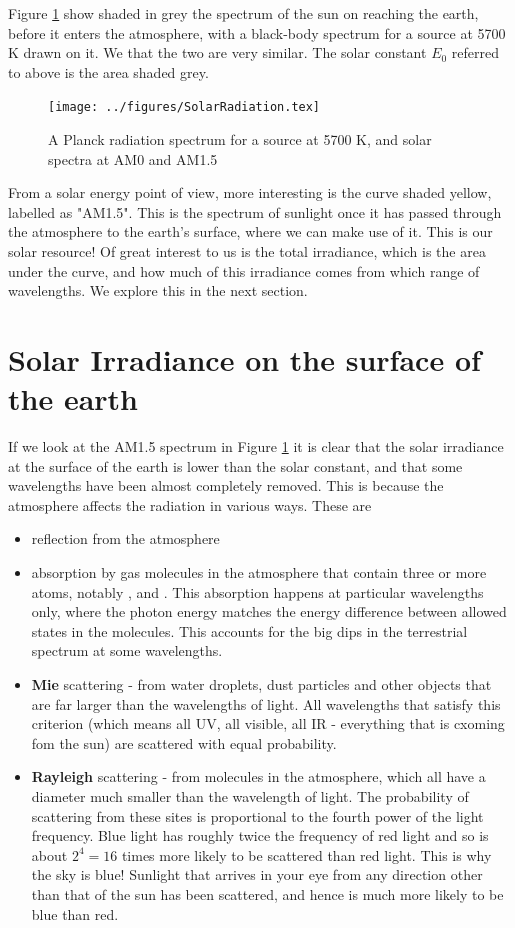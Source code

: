 \documentclass[class=scrartcl, crop=false,parskip=half,]{standalone}
\begin{document}
Figure \ref{fig:SolarSpectra} show shaded in grey the spectrum of the sun on reaching the earth, before it enters the atmosphere, with a black-body spectrum for a source at 5700 K drawn on it. We that the two are very similar. The solar constant $E_0$ referred to above is the area shaded grey.

\begin{figure}
\centering
\texttt{[image: ../figures/SolarRadiation.tex]}
\caption{A Planck radiation spectrum for a source at 5700 K, and solar spectra at AM0 and AM1.5}
\label{fig:SolarSpectra}
\end{figure}

From a solar energy point of view, more interesting is the curve shaded yellow, labelled as "AM1.5". This is the spectrum of sunlight once it has passed through the atmosphere to the earth's surface, where we can make use of it. This is our solar resource! Of great interest to us is the total irradiance, which is the area under the curve, and  how much of this irradiance comes from which range of wavelengths. We explore this in the next section.

\section{Solar Irradiance on the surface of the earth}
If we look at the AM1.5 spectrum in Figure \ref{fig:SolarSpectra} it is clear that the solar irradiance at the surface of the earth is lower than the solar constant, and that some wavelengths have been almost completely removed. This is because the atmosphere affects the radiation in various ways. These are
\begin{itemize}
\item reflection from the atmosphere
\item absorption by gas molecules in the atmosphere that contain three or more atoms, notably ,  and . This absorption happens at particular wavelengths only, where the photon energy matches the energy difference between allowed states in the molecules. This accounts for the big dips in the terrestrial spectrum at some wavelengths.
\item \textbf{Mie} scattering - from water droplets, dust particles and other objects that are far larger than the wavelengths of light. All wavelengths that satisfy this criterion (which means all UV, all visible, all IR - everything that is cxoming fom the sun) are scattered with equal probability.
\item \textbf{Rayleigh} scattering - from molecules in the atmosphere, which all have a diameter much smaller than the wavelength of light. The probability of scattering from these sites is proportional to the fourth power of the light frequency. Blue light has roughly twice the frequency of red light and so is about $2^4=16$ times more likely to be scattered than red light. This is why the sky is blue! Sunlight that arrives in your eye from any direction other than that of the sun has been scattered, and hence is much more likely to be blue than red. 
\end{itemize}
\end{document}
